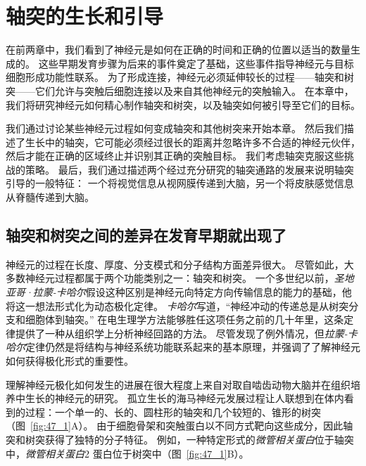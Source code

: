 \chapter{轴突的生长和引导} \label{chap:chap47}


在前两章中，我们看到了神经元是如何在正确的时间和正确的位置以适当的数量生成的。
这些早期发育步骤为后来的事件奠定了基础，这些事件指导神经元与目标细胞形成功能性联系。
为了形成连接，神经元必须延伸较长的过程——轴突和树突——它们允许与突触后细胞连接以及来自其他神经元的突触输入。
在本章中，我们将研究神经元如何精心制作轴突和树突，以及轴突如何被引导至它们的目标。


我们通过讨论某些神经元过程如何变成轴突和其他树突来开始本章。
然后我们描述了生长中的轴突，它可能必须经过很长的距离并忽略许多不合适的神经元伙伴，然后才能在正确的区域终止并识别其正确的突触目标。
我们考虑轴突克服这些挑战的策略。
最后，我们通过描述两个经过充分研究的轴突通路的发展来说明轴突引导的一般特征：
一个将视觉信息从视网膜传递到大脑，另一个将皮肤感觉信息从脊髓传递到大脑。



\section{轴突和树突之间的差异在发育早期就出现了}

神经元的过程在长度、厚度、分支模式和分子结构方面差异很大。
尽管如此，大多数神经元过程都属于两个功能类别之一：轴突和树突。
一个多世纪以前，\textit{圣地亚哥·拉蒙-卡哈尔}假设这种区别是神经元向特定方向传输信息的能力的基础，他将这一想法形式化为动态极化定律。
\textit{卡哈尔}写道，“神经冲动的传递总是从树突分支和细胞体到轴突。” 
在电生理学方法能够胜任这项任务之前的几十年里，这条定律提供了一种从组织学上分析神经回路的方法。
尽管发现了例外情况，但\textit{拉蒙-卡哈尔}定律仍然是将结构与神经系统功能联系起来的基本原理，并强调了了解神经元如何获得极化形式的重要性。


理解神经元极化如何发生的进展在很大程度上来自对取自啮齿动物大脑并在组织培养中生长的神经元的研究。
孤立生长的海马神经元发展过程让人联想到在体内看到的过程：一个单一的、长的、圆柱形的轴突和几个较短的、锥形的树突（图~\ref{fig:47_1}A）。
由于细胞骨架和突触蛋白以不同方式靶向这些成分，因此轴突和树突获得了独特的分子特征。
例如，一种特定形式的\textit{微管相关蛋白}位于轴突中，\textit{微管相关蛋白}2 蛋白位于树突中（图~\ref{fig:47_1}B）。



